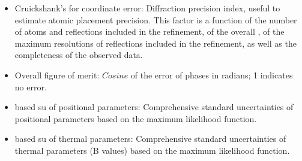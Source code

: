 \begin{itemize}
\begin{itemize}
\begin{itemize}
     \item Cruickshank's  for coordinate error: Diffraction precision index, useful to estimate atomic placement precision. This factor is a function of the number of atoms and reflections included in the refinement, of the overall , of the maximum resolutions of reflections included in the refinement, as well as the completeness of the observed data.
     
     \item Overall figure of merit: $Cosine$ of the error of phases in radians; 1 indicates no error.
     
     \item {} based su of positional parameters: Comprehensive standard uncertainties of positional parameters based on the maximum likelihood function.
     
     \item {} based su of thermal parameters: Comprehensive standard uncertainties of thermal parameters (B values) based on the maximum likelihood function.
     \end{itemize}
     

\end{itemize}
\end{itemize}
